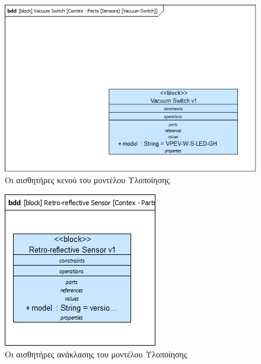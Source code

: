 \documentclass[a4paper,12pt,twoside]{report}
\begin{document}
\begin{appendices}
				\clearpage
				\begin{figure}[hp]
					\centering
					\includegraphics[scale=0.50]{DesignModel_Contex-Parts(Sensors)[VacuumSwitch].png}
					\caption{Οι αισθητήρες κενού του μοντέλου Υλοποίησης}
					\label{φωτ:Οι αισθητήρες κενού του μοντέλου Υλοποίησης}
				\end{figure}
				
				\begin{figure}[hp]
					\centering
					\includegraphics[scale=0.50]{DesignModel_Contex-Parts(Sensors)[Retro-reflectiveSensors].png}
					\caption{Οι αισθητήρες ανάκλασης του μοντέλου Υλοποίησης}
					\label{φωτ:Οι αισθητήρες ανάκλασης του μοντέλου Υλοποίησης}
				\end{figure}
				

\end{appendices}
\end{document}
